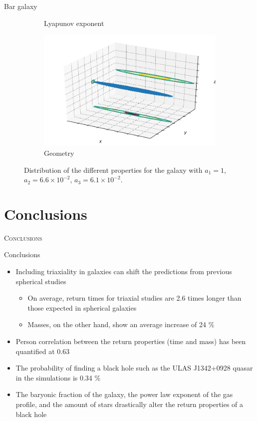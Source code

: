 \documentclass[handout]{beamer}
\begin{document}
\begin{frame}{Bar galaxy}
\begin{figure}[h]
\begin{subfigure}[t]{0.35\textwidth}
			\caption{Lyapunov exponent}
		\end{subfigure}
		\begin{subfigure}[t]{0.35\textwidth}
			\includegraphics[width=\textwidth]{"../Files/Week 13/images/22_ellipsoid"}
			\caption{Geometry}
		\end{subfigure}
		\caption{Distribution of the different properties for the galaxy with $a_1 = 1$, $a_2 = 6.6\times10^{-2}$, $a_3 = 6.1\times10^{-2}$.}
	\end{figure}
\end{frame}

\section{Conclusions}
\begin{frame}
	\centering
	\Huge
	\scshape
	Conclusions
\end{frame}

\begin{frame}{Conclusions}
	\begin{itemize}
		\item Including triaxiality in galaxies can shift the predictions from previous spherical studies
		\begin{itemize}
			\item On average, return times for triaxial studies are 2.6 times longer than those	expected in spherical galaxies
			\item Masses, on the other hand, show an average increase of 24 \%
		\end{itemize}
		\item Person correlation between the return properties (time and mass) has been quantified at 0.63
		\item The probability of finding a black hole such as the ULAS J1342+0928 quasar in the simulations is 0.34 \%
		\item The baryonic fraction of the galaxy, the power law
		exponent of the gas profile, and the amount of stars drastically alter the return properties of a black hole
	\end{itemize}
\end{frame}
\end{document}
